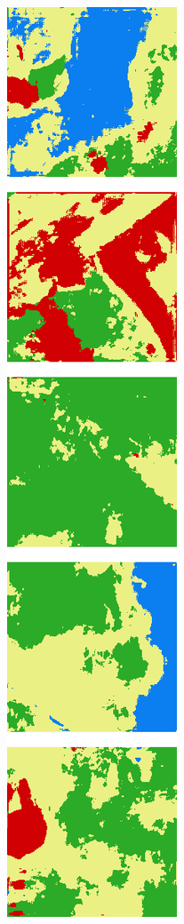 \begin{figure}[h]
\begin{subfigure}{\DensenetPredictionsImageWidth}
        \caption{}
        \label{fig:densenet_pred_103d}
    \end{subfigure} \hspace{1mm}
    \begin{subfigure}{\DensenetPredictionsImageWidth}
        \includegraphics[width=\textwidth]{images/densenet/103cd}
        \caption{}
        \label{fig:densenet_pred_103cd}
    \end{subfigure}


\end{figure}
